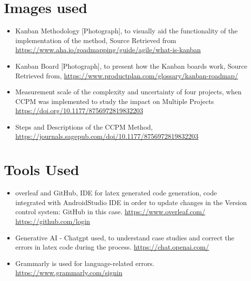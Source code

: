 \documentclass{llncs}
\begin{document}
\begin{subappendices}
\renewcommand{\thesection}{\Alph{section}}
\section{Images used}
\begin{itemize}
    \item Kanban Methodology [Photograph], to visually aid the functionality of the implementation of the method, Source Retrieved from \url{https://www.aha.io/roadmapping/guide/agile/what-is-kanban}
    \item Kanban Board [Photograph], to present how the Kanban boards work,
    Source Retrieved from, \url{https://www.productplan.com/glossary/kanban-roadmap/}
    \item Measurement scale of the complexity and uncertainty of four projects, when CCPM was implemented to study the impact on Multiple Projects \url{https://doi.org/10.1177/8756972819832203}
    \item Steps and Descriptions of the CCPM Method, \url{https://journals.sagepub.com/doi/10.1177/8756972819832203}
\end{itemize}
\section{Tools Used}
\begin{itemize}
    \item overleaf and GitHub, IDE for latex generated code generation, code integrated with AndroidStudio IDE in order to update changes in the Version control system: GitHub in this case. \url{https://www.overleaf.com/}
    \url{https://github.com/login}
    \item Generative AI - Chatgpt used, to understand case studies and correct the errors in latex code during the process. \url{https://chat.openai.com/}
    \item Grammarly is used for language-related errors. \url{https://www.grammarly.com/signin}


\end{itemize}

\end{subappendices}
\end{document}
